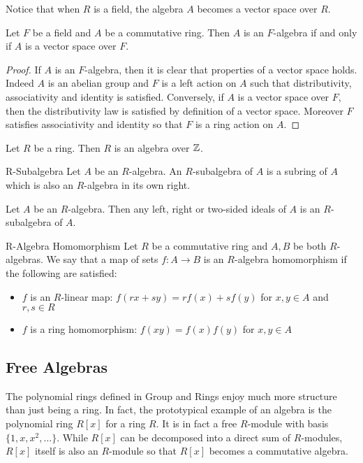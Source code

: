 \documentclass[a4paper]{article}
\begin{document}
Notice that when $R$ is a field, the algebra $A$ becomes a vector space over $R$. 

\begin{lmm}{}{} Let $F$ be a field and $A$ be a commutative ring. Then $A$ is an $F$-algebra if and only if $A$ is a vector space over $F$. \tcbline
\begin{proof}
If $A$ is an $F$-algebra, then it is clear that properties of a vector space holds. Indeed $A$ is an abelian group and $F$ is a left action on $A$ such that distributivity, associativity and identity is satisfied. Conversely, if $A$ is a vector space over $F$, then the distributivity law is satisfied by definition of a vector space. Moreover $F$ satisfies associativity and identity so that $F$ is a ring action on $A$. 
\end{proof}
\end{lmm}

\begin{lmm}{}{} Let $R$ be a ring. Then $R$ is an algebra over $\mathbb{Z}$. 
\end{lmm}

\begin{defn}{R-Subalgebra}{} Let $A$ be an $R$-algebra. An $R$-subalgebra of $A$ is a subring of $A$ which is also an $R$-algebra in its own right. 
\end{defn}

\begin{prp}{}{} Let $A$ be an $R$-algebra. Then any left, right or two-sided ideals of $A$ is an $R$-subalgebra of $A$. 
\end{prp}

\begin{defn}{R-Algebra Homomorphism}{} Let $R$ be a commutative ring and $A,B$ be both $R$-algebras. We say that a map of sets $f:A\to B$ is an $R$-algebra homomorphism if the following are satisfied: 
\begin{itemize}
\item $f$ is an $R$-linear map: $f(rx+sy)=rf(x)+sf(y)$ for $x,y\in A$ and $r,s\in R$
\item $f$ is a ring homomorphism: $f(xy)=f(x)f(y)$ for $x,y\in A$
\end{itemize}
\end{defn}

\subsection{Free Algebras}
The polynomial rings defined in Group and Rings enjoy much more structure than just being a ring. In fact, the prototypical example of an algebra is the polynomial ring $R[x]$ for a ring $R$. It is in fact a free $R$-module with basis $\{1,x,x^2,\dots\}$. While $R[x]$ can be decomposed into a direct sum of $R$-modules, $R[x]$ itself is also an $R$-module so that $R[x]$ becomes a commutative algebra. 
\end{document}
